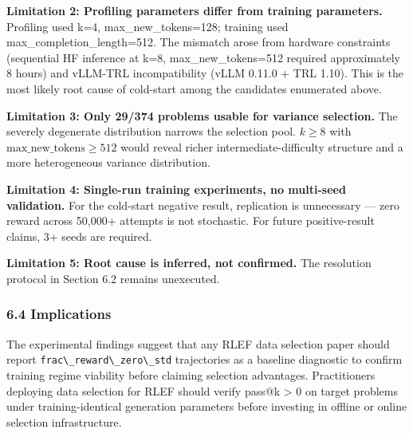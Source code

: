 \textbf{Limitation 2: Profiling parameters differ from training parameters.} Profiling used k=4, max\_new\_tokens=128; training used max\_completion\_length=512. The mismatch arose from hardware constraints (sequential HF inference at k=8, max\_new\_tokens=512 required approximately 8 hours) and vLLM-TRL incompatibility (vLLM 0.11.0 + TRL 1.10). This is the most likely root cause of cold-start among the candidates enumerated above.

\textbf{Limitation 3: Only 29/374 problems usable for variance selection.} The severely degenerate distribution narrows the selection pool. $k\geq 8$ with $\text{max\_new\_tokens}\geq 512$ would reveal richer intermediate-difficulty structure and a more heterogeneous variance distribution.

\textbf{Limitation 4: Single-run training experiments, no multi-seed validation.} For the cold-start negative result, replication is unnecessary --- zero reward across 50,000+ attempts is not stochastic. For future positive-result claims, 3+ seeds are required.

\textbf{Limitation 5: Root cause is inferred, not confirmed.} The resolution protocol in Section 6.2 remains unexecuted.

\subsubsection{6.4 Implications}

The experimental findings suggest that any RLEF data selection paper should report \texttt{frac\textbackslash \_reward\textbackslash \_zero\textbackslash \_std} trajectories as a baseline diagnostic to confirm training regime viability before claiming selection advantages. Practitioners deploying data selection for RLEF should verify pass@k > 0 on target problems under training-identical generation parameters before investing in offline or online selection infrastructure.

